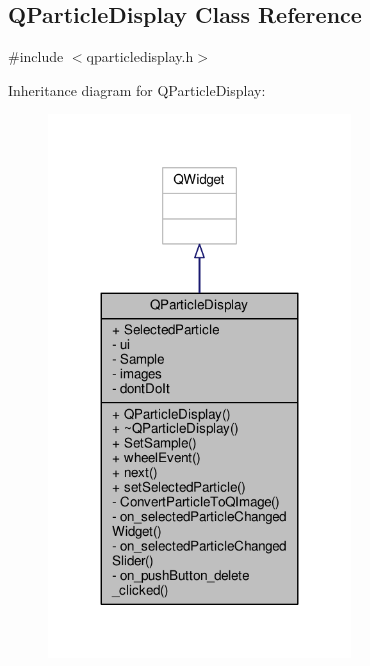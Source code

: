 \hypertarget{class_q_particle_display}{}\subsection{Q\+Particle\+Display Class Reference}
\label{class_q_particle_display}


{\ttfamily \#include $<$qparticledisplay.\+h$>$}



Inheritance diagram for Q\+Particle\+Display\+:
\nopagebreak
\begin{figure}[H]
\begin{center}
\leavevmode
\includegraphics[width=227pt]{class_q_particle_display__inherit__graph}
\end{center}
\end{figure}



